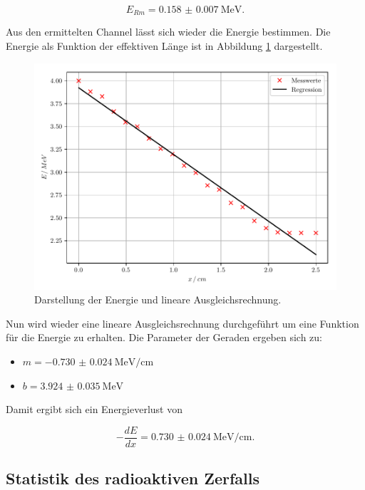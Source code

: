 \begin{equation*}
  E_{Rm} = \SI{0.158(7)}{\mega\eV}.
\end{equation*}

Aus den ermittelten Channel lässt sich wieder die Energie bestimmen. Die Energie
als Funktion der effektiven Länge ist in Abbildung \ref{abb:5} dargestellt.

\begin{figure}[H]
  \centering
  \includegraphics{plot4.pdf}
  \caption{Darstellung der Energie und lineare Ausgleichsrechnung.}
  \label{abb:5}
\end{figure}

Nun wird wieder eine lineare Ausgleichsrechnung durchgeführt um eine Funktion
für die Energie zu erhalten. Die Parameter der Geraden ergeben sich zu:

\begin{itemize}
  \item $m = \SI{-0.730(24)}{\mega\eV\per\centi\meter}$
  \item $b = \SI{3.924(35)}{\mega\eV}$
\end{itemize}

Damit ergibt sich ein Energieverlust von

\begin{equation*}
  -\frac{dE}{dx} = \SI{0.730(24)}{\mega\eV\per\centi\meter}.
\end{equation*}

\subsection{Statistik des radioaktiven Zerfalls}

